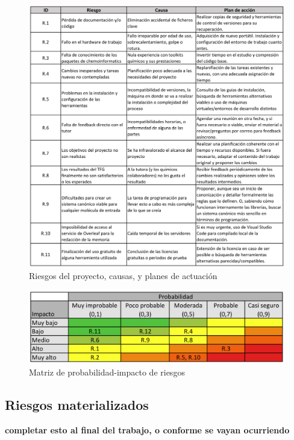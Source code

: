 \begin{figure}
    \centering
    \includegraphics[scale=1]{imagenes/planificacion/riesgos-1_cropped.png}
    \caption{Riesgos del proyecto, causas, y planes de actuación}
    \label{tabla:tabla_riesgos}
\end{figure}

\begin{figure}
    \centering
    \includegraphics[scale=0.95]{imagenes/planificacion/matriz_riesgos.png}
    \caption{Matriz de probabilidad-impacto de riesgos}
    \label{tabla:riesgos_matriz_probabilidad}
\end{figure}

\subsection{Riesgos materializados}\label{riesgos_materializados}

\textbf{completar esto al final del trabajo, o conforme se vayan ocurriendo}


